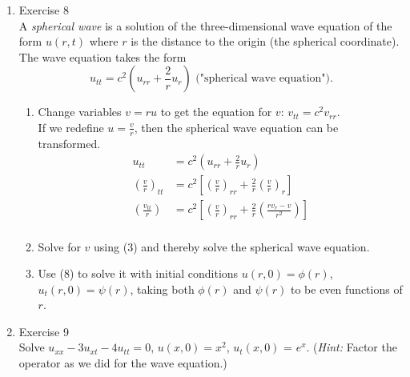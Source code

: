 \documentclass[12pt]{article}%
\begin{document}
\begin{enumerate}
\begin{enumerate}
        \item Exercise 8 \smallskip \\
        A \emph{spherical wave} is a solution of the three-dimensional wave equation of the form $u\left(r,t\right)$ where $r$ is the distance to the origin (the spherical coordinate). The wave equation takes the form
        $$u_{tt} = c^2\left(u_{rr} + \frac{2}{r}u_r\right) \text{    ("spherical wave equation").}$$
        \begin{enumerate}
            \item Change variables $v = ru$ to get the equation for $v$:  $v_{tt} = c^2v_{rr}$. \smallskip \\
            If we redefine $u = \frac{v}{r}$, then the spherical wave equation can be transformed. 
            \begin{align*}
                u_{tt} &= c^2\left(u_{rr} + \frac{2}{r}u_r\right) \\
                \left(\frac{v}{r}\right)_{tt} &= c^2\left[\left(\frac{v}{r}\right)_{rr} + \frac{2}{r}\left(\frac{v}{r}\right)_r\right] \\
                \left(\frac{v_{tt}}{r}\right) &= c^2\left[\left(\frac{v}{r}\right)_{rr} + \frac{2}{r}\left(\frac{rv_r - v}{r^2}\right)\right] \\
            \end{align*}

            \item Solve for $v$ using (3) and thereby solve the spherical wave equation. \smallskip \\

            \item Use (8) to solve it with initial conditions $u\left(r,0\right) = \phi\left(r\right)$, $u_t\left(r,0\right) = \psi\left(r\right)$, taking both $\phi\left(r\right)$ and $\psi\left(r\right)$ to be even functions of $r$. \smallskip \\

            
        \end{enumerate}
        
        \item Exercise 9 \smallskip \\
        Solve $u_{xx} - 3 u_{xt} - 4u_{tt} = 0$, $u\left(x,0\right) = x^2$, $u_t\left(x,0\right)$ = $e^x$. (\emph{Hint:} Factor the operator as we did for the wave equation.) \smallskip \\

        
    \end{enumerate}


\end{enumerate}
\end{document}
